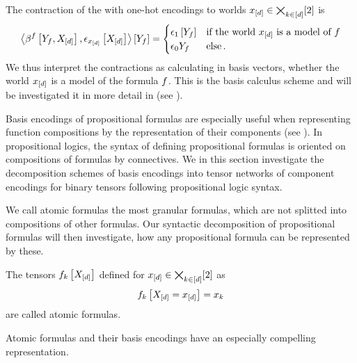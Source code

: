 The contraction of the \basisEncoding{} with one-hot encodings to worlds $x_{[d]}\in\bigtimes_{k\in[d]}[2]$ is
\begin{align*}
    \left\langle \beta^{f}\left[Y_{f},X_{[d]}\right],\epsilon_{x_{[d]}}\left[X_{[d]}\right]\right\rangle \left[ Y_{f} \right]
    = \begin{cases}
          \epsilon_1\left[Y_{f}\right] & \text{if the world $x_{[d]}$ is a model of $f$}  \\
          \epsilon_0{Y_{f}} & \text{else} \, .
    \end{cases}
\end{align*}
We thus interpret the contractions as calculating in basis vectors, whether the world $x_{[d]}$ is a model of the formula $f$.
This is the basis calculus scheme and will be investigated it in more detail in  (see ).



Basis encodings of propositional formulas are especially useful when representing function compositions by the representation of their components (see ).
In propositional logics, the syntax of defining propositional formulas is oriented on compositions of formulas by connectives. %
We in this section investigate the decomposition schemes of basis encodings into tensor networks of component encodings for binary tensors following propositional logic syntax.


We call atomic formulas the most granular formulas, which are not splitted into compositions of other formulas.
Our syntactic decomposition of propositional formulas will then investigate, how any propositional formula can be represented by these.

\begin{definition}
    The tensors $f_{k}\left[X_{[d]}\right]$ defined for $x_{[d]}\in\bigtimes_{k\in[d]}[2]$ as
    \begin{align*}
        f_{k}\left[X_{[d]}=x_{[d]}\right]
        = x_{k}
    \end{align*}
    are called atomic formulas.
\end{definition}

Atomic formulas and their basis encodings have an especially compelling representation.

